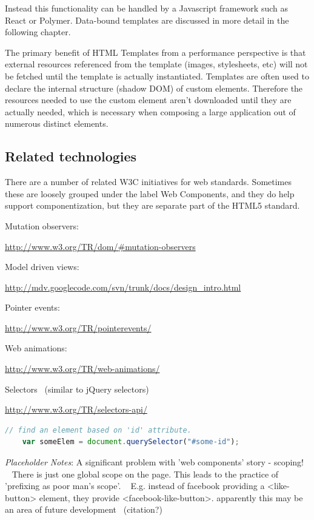 Instead this functionality can be handled by a Javascript framework such as React or Polymer.
Data-bound templates are discussed in more detail in the following chapter.

The primary benefit of HTML Templates from a performance perspective is that external resources referenced from the template (images, stylesheets, etc) will not be fetched until the template is actually instantiated.
Templates are often used to declare the internal structure (shadow DOM) of custom elements. 
Therefore the resources needed to use the custom element aren't downloaded until they are actually needed, which is necessary when composing a large application out of numerous distinct elements.



\subsection{Related technologies}
There are a number of related W3C initiatives for web standards. 
Sometimes these are loosely grouped under the label Web Components,
and they do help support componentization, 
but they are separate part of the HTML5 standard.

Mutation observers:

\url{http://www.w3.org/TR/dom/#mutation-observers}

Model driven views:

\url{http://mdv.googlecode.com/svn/trunk/docs/design_intro.html}

Pointer events:

\url{http://www.w3.org/TR/pointerevents/}

Web animations:

\url{http://www.w3.org/TR/web-animations/}

Selectors  (similar to jQuery selectors)

\url{http://www.w3.org/TR/selectors-api/}

\begin{lstlisting}[language=JavaScript,numbers=none]
	// find an element based on 'id' attribute.
	var someElem = document.querySelector("#some-id");
\end{lstlisting}

\textit{Placeholder Notes}:
A significant problem with 'web components' story - scoping!  
There is just one global scope on the page.
This leads to the practice of 'prefixing as poor man's scope'.  
E.g. instead of facebook providing a <like-button> element, they provide <facebook-like-button>.
apparently this may be an area of future development  (citation?)

